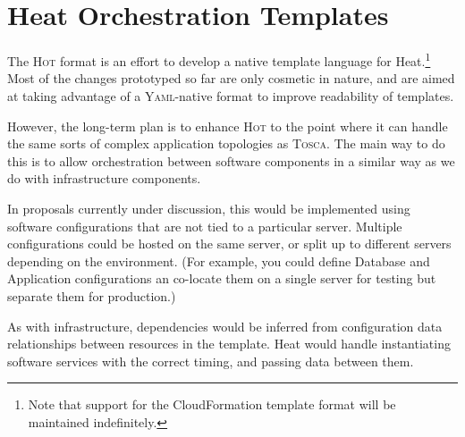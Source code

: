 \section{Heat Orchestration Templates}

The \textsc{Hot} format is an effort to develop a native template language for Heat.\footnote{Note that support for the CloudFormation template format will be maintained indefinitely.} Most of the changes prototyped so far are only cosmetic in nature, and are aimed at taking advantage of a \textsc{Yaml}-native format to improve readability of templates.

However, the long-term plan is to enhance \textsc{Hot} to the point where it can handle the same sorts of complex application topologies as \textsc{Tosca}. The main way to do this is to allow orchestration between software components in a similar way as we do with infrastructure components.

In proposals currently under discussion, this would be implemented using software configurations that are not tied to a particular server. Multiple configurations could be hosted on the same server, or split up to different servers depending on the environment. (For example, you could define Database and Application configurations an co-locate them on a single server for testing but separate them for production.)

As with infrastructure, dependencies would be inferred from configuration data relationships between resources in the template. Heat would handle instantiating software services with the correct timing, and passing data between them.
